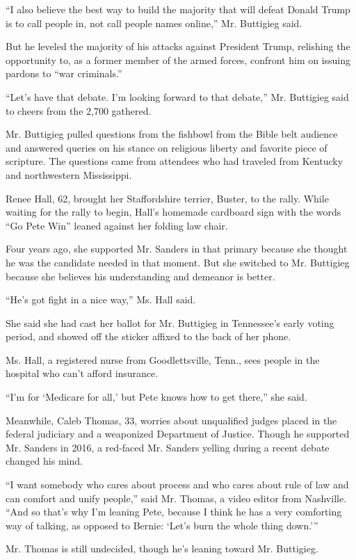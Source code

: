 ``I also believe the best way to build the majority that will defeat
Donald Trump is to call people in, not call people names online,'' Mr.
Buttigieg said.

But he leveled the majority of his attacks against President Trump,
relishing the opportunity to, as a former member of the armed forces,
confront him on issuing pardons to ``war criminals.''

``Let's have that debate. I'm looking forward to that debate,'' Mr.
Buttigieg said to cheers from the 2,700 gathered.

Mr. Buttigieg pulled questions from the fishbowl from the Bible belt
audience and answered queries on his stance on religious liberty and
favorite piece of scripture. The questions came from attendees who had
traveled from Kentucky and northwestern Mississippi.

Renee Hall, 62, brought her Staffordshire terrier, Buster, to the rally.
While waiting for the rally to begin, Hall's homemade cardboard sign
with the words ``Go Pete Win'' leaned against her folding law chair.

Four years ago, she supported Mr. Sanders in that primary because she
thought he was the candidate needed in that moment. But she switched to
Mr. Buttigieg because she believes his understanding and demeanor is
better.

``He's got fight in a nice way,'' Ms. Hall said.

She said she had cast her ballot for Mr. Buttigieg in Tennessee's early
voting period, and showed off the sticker affixed to the back of her
phone.

Ms. Hall, a registered nurse from Goodlettsville, Tenn., sees people in
the hospital who can't afford insurance.

``I'm for `Medicare for all,' but Pete knows how to get there,'' she
said.

Meanwhile, Caleb Thomas, 33, worries about unqualified judges placed in
the federal judiciary and a weaponized Department of Justice. Though he
supported Mr. Sanders in 2016, a red-faced Mr. Sanders yelling during a
recent debate changed his mind.

``I want somebody who cares about process and who cares about rule of
law and can comfort and unify people,'' said Mr. Thomas, a video editor
from Nashville. ``And so that's why I'm leaning Pete, because I think he
has a very comforting way of talking, as opposed to Bernie: `Let's burn
the whole thing down.'''

Mr. Thomas is still undecided, though he's leaning toward Mr. Buttigieg.

